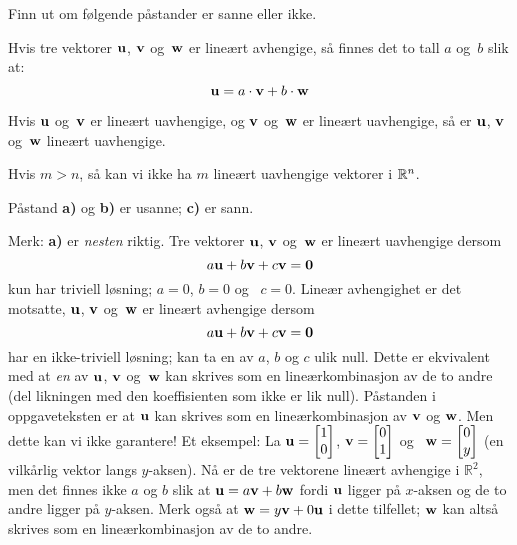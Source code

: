 \begin{oppgave}
Finn ut om følgende påstander er sanne eller ikke.
\begin{punkt}
Hvis tre vektorer $\mathbf{u}$, $\mathbf{v}$ og~$\mathbf{w}$ er lineært
avhengige, så finnes det to tall $a$ og~$b$ slik at: 
\[
\mathbf{u} = a \cdot \mathbf{v} + b \cdot \mathbf{w}
\]
\end{punkt}

\begin{punkt}
Hvis $\mathbf{u}$ og~$\mathbf{v}$ er lineært uavhengige,
og $\mathbf{v}$ og~$\mathbf{w}$ er lineært uavhengige,
så er $\mathbf{u}$, $\mathbf{v}$ og~$\mathbf{w}$ lineært uavhengige.
\end{punkt}

\begin{punkt}
Hvis $m>n$, så kan vi ikke ha $m$ lineært uavhengige vektorer i $\mathbb{R}^n$.
\end{punkt}

\end{oppgave}

\begin{losning}
Påstand \textbf{a)} og \textbf{b)} er usanne; \textbf{c)} er sann.

\noindent
Merk: \textbf{a)} er \emph{nesten} riktig. Tre vektorer $\mathbf{u}$, $\mathbf{v}$ og~$\mathbf{w}$ er lineært uavhengige dersom $$a\mathbf{u}+b\mathbf{v}+c\mathbf{v}=\mathbf{0}$$ kun har triviell løsning; $a=0$, $b=0$ og ~$c=0$. Lineær avhengighet er det motsatte, $\mathbf{u}$, $\mathbf{v}$ og~$\mathbf{w}$ er lineært avhengige dersom $$a\mathbf{u}+b\mathbf{v}+c\mathbf{v}=\mathbf{0}$$ har en ikke-triviell løsning; kan ta en av $a$, $b$ og $c$ ulik null. Dette er ekvivalent med at \emph{en} av $\mathbf{u}$, $\mathbf{v}$ og~$\mathbf{w}$ kan skrives som en lineærkombinasjon av de to andre (del likningen med den koeffisienten som ikke er lik null). Påstanden i oppgaveteksten er at $\mathbf{u}$ kan skrives som en lineærkombinasjon av $\mathbf{v}$ og $\mathbf{w}$. Men dette kan vi ikke garantere! Et eksempel: La $\mathbf{u}=\begin{bmatrix} 1 \\ 0 \end{bmatrix}$, $\mathbf{v}=\begin{bmatrix} 0 \\ 1 \end{bmatrix}$ og~ $\mathbf{w}=\begin{bmatrix} 0 \\ y \end{bmatrix}$ (en vilkårlig vektor langs $y$-aksen). Nå er de tre vektorene lineært avhengige i $\mathbb{R}^2$, men det finnes ikke $a$ og $b$ slik at $\mathbf{u}=a\mathbf{v}+b\mathbf{w}$ fordi $\mathbf{u}$ ligger på $x$-aksen og de to andre ligger på $y$-aksen. Merk også at $\mathbf{w}=y\mathbf{v}+0\mathbf{u}$ i dette tilfellet; $\mathbf{w}$ kan altså skrives som en lineærkombinasjon av de to andre.
\end{losning}









